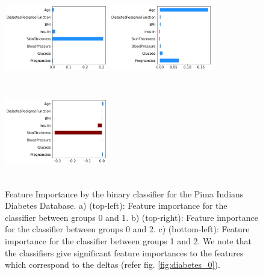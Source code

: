 \begin{figure}
\centering
    \centering
     \includegraphics[width=0.4\textwidth, height=4cm]{../openreview/images/diabetes/0_.png}
     \includegraphics[width=0.4\textwidth, height=4cm]{../openreview/images/diabetes/1_.png}
      \includegraphics[width=0.4\textwidth, height=4cm]{../openreview/images/diabetes/2_.png}
    \caption{Feature Importance by the binary classifier for the Pima Indians Diabetes Database. a) (top-left): Feature importance for the classifier between groups 0 and 1. b) (top-right): Feature importance for the classifier between groups 0 and 2. c) (bottom-left): Feature importance for the classifier between groups 1 and 2. We note that the classifiers give significant feature importances to the features which correspond to the deltas (refer fig. \ref{fig:diabetes_0}).}
    \label{fig:diabetes_1}
\end{figure}